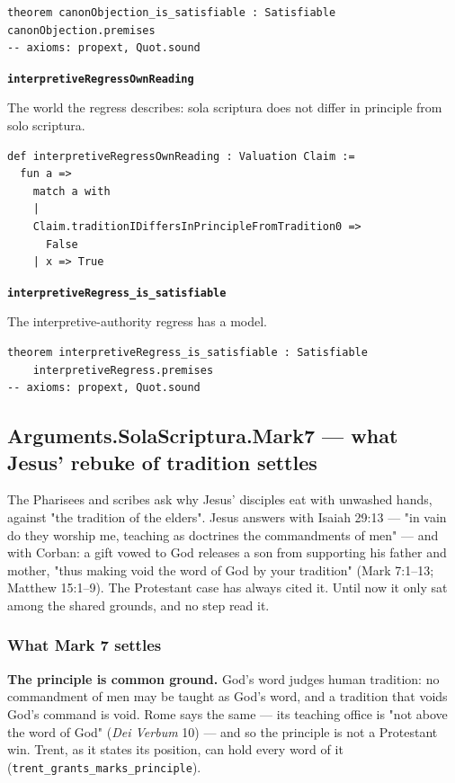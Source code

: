 \documentclass[11pt]{article}
\begin{document}
{\small\begin{verbatim}
theorem canonObjection_is_satisfiable : Satisfiable canonObjection.premises
-- axioms: propext, Quot.sound
\end{verbatim}}
\par\medskip\noindent\textbf{\texttt{interpretive\allowbreak{}Regress\allowbreak{}Own\allowbreak{}Reading}}\par\nobreak\noindent
The world the regress describes: sola scriptura does not differ in principle from solo scriptura.

{\small\begin{verbatim}
def interpretiveRegressOwnReading : Valuation Claim :=
  fun a =>
    match a with
    |
    Claim.traditionIDiffersInPrincipleFromTradition0 =>
      False
    | x => True
\end{verbatim}}
\par\medskip\noindent\textbf{\texttt{interpretive\allowbreak{}Regress\_\allowbreak{}is\_\allowbreak{}satisfiable}}\par\nobreak\noindent
The interpretive-authority regress has a model.

{\small\begin{verbatim}
theorem interpretiveRegress_is_satisfiable : Satisfiable
    interpretiveRegress.premises
-- axioms: propext, Quot.sound
\end{verbatim}}
\subsection*{Arguments.SolaScriptura.Mark7 — what Jesus' rebuke of tradition settles}
The Pharisees and scribes ask why Jesus' disciples eat with unwashed hands, against "the tradition of the elders". Jesus answers with Isaiah 29:13 — "in vain do they worship me, teaching as doctrines the commandments of men" — and with Corban: a gift vowed to God releases a son from supporting his father and mother, "thus making void the word of God by your tradition" (Mark 7:1–13; Matthew 15:1–9). The Protestant case has always cited it. Until now it only sat among the shared grounds, and no step read it.

\subsubsection*{What Mark 7 settles}
\textbf{The principle is common ground.} God's word judges human tradition: no commandment of men may be taught as God's word, and a tradition that voids God's command is void. Rome says the same — its teaching office is "not above the word of God" (\emph{Dei Verbum} 10) — and so the principle is not a Protestant win. Trent, as it states its position, can hold every word of it (\texttt{trent\_\allowbreak{}grants\_\allowbreak{}marks\_\allowbreak{}principle}).
\end{document}
